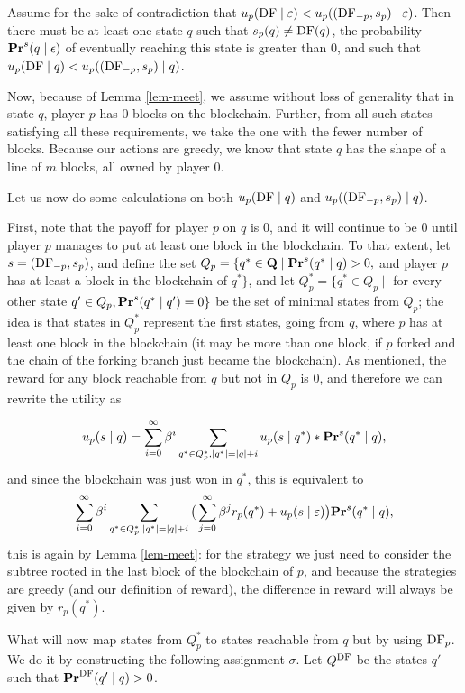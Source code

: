 Assume for the sake of contradiction that $u_p(\text{\rm DF} \mid \varepsilon) < u_p( (\text{\rm DF}_{-p},s_p) \mid \varepsilon)$. Then there must be at least one 
state $q$ such that $s_p(q) \neq \text{\rm DF}(q)$, the probability $\mathbf{Pr}^s(q \mid \epsilon)$ of eventually reaching this state is greater than $0$, and such that $u_p(\text{\rm DF} \mid q) < u_p( (\text{\rm DF}_{-p},s_p) \mid q)$. 


Now, because of Lemma \ref{lem-meet}, we assume without loss of generality that in state $q$, player $p$ has $0$ blocks on the blockchain. Further, from all such states satisfying all these requirements, we take the one with the fewer number of blocks. Because our actions are greedy, we know that state $q$ has the shape of a line of $m$ blocks, all owned by player $0$. 

Let us now do some calculations on both $u_p(\text{\rm DF} \mid q)$ and $u_p( (\text{\rm DF}_{-p},s_p) \mid q)$. 
\medskip

First, note that the payoff for player $p$ on $q$ is $0$, and it will continue to be $0$ until player $p$ manages to put at least one block in the blockchain. To that extent, let $s = (\text{\rm DF}_{-p},s_p)$, and define the set 
$Q_p = \{q^* \in \mathbf{Q} \mid \mathbf{Pr}^s(q^* \mid q) > 0, $ and player $p$ has at least a block in the blockchain of $q^* \}$, 
and let $Q^*_p=\{q^* \in Q_p \mid$ for every other state $q' \in Q_p, \mathbf{Pr}^s(q^* \mid q')=0 \}$ be the set of minimal states from $Q_p$; 
the idea is that states in $Q^*_p$ represent the first states, going from $q$, where $p$ has at least one block in the blockchain 
(it may be more than one block, if $p$ forked and the chain of the forking branch just became the blockchain). 
As mentioned, the reward for any block reachable from $q$ but not in $Q_p$ is $0$, and therefore we can rewrite the utility as

$$u_p( s \mid q) = \sum_{i=0}^\infty \beta^i \sum_{q^* \in Q^*_p, |q^*| = |q| + i} u_p(s \mid q^*) * \mathbf{Pr}^s(q^* \mid q), $$
and since the blockchain was just won in $q^*$, %
this is equivalent to 
$$ \sum_{i=0}^\infty \beta^i \sum_{q^* \in Q^*_p, |q^*| = |q| + i} \big(\sum_{j = 0}^\infty \beta^j r_p(q^*) + u_p(s \mid \varepsilon) \big) \mathbf{Pr}^s(q^* \mid q), $$
this is again by Lemma \ref{lem-meet}: for the strategy we just need to consider the subtree rooted in the last block of the blockchain of $p$, and 
because the strategies are greedy (and our definition of reward), the difference in reward will always be given by $r_p(q^*)$. 

What will now map states from $Q^*_p$ to states reachable from $q$ but by using $\text{\rm DF}_p$. We do it by constructing the following assignment $\sigma$.
Let $Q^{\text{\rm DF}}$ be the states $q'$ such that $\mathbf{Pr}^{\text{\rm DF}}(q' \mid q) > 0$. 

